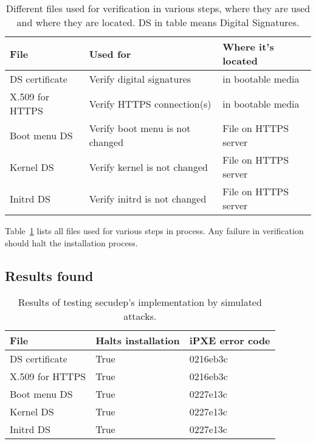 \begin{table}[!ht]
  \def\arraystretch{1.1}%
  \begin{center}
    \begin{tabular}{| l | l | l |}
      \hline
      File            & Used for                        & Where it's located   \\
      \hline
      DS certificate  & Verify digital signatures       & in bootable media    \\
      X.509 for HTTPS & Verify HTTPS connection(s)      & in bootable media    \\
      Boot menu DS    & Verify boot menu is not changed & File on HTTPS server \\
      Kernel DS       & Verify kernel is not changed    & File on HTTPS server \\
      Initrd DS       & Verify initrd is not changed    & File on HTTPS server \\
      \hline
    \end{tabular}
    \caption{Different files used for verification in various steps,
      where they are used and where they are located. DS in table
      means Digital Signatures.\label{tab:verification_files}}
  \end{center}
\end{table}

Table~\ref{tab:verification_files} lists all files used for various
steps in process. Any failure in verification should halt the installation process.


\subsection{Results found}

\begin{table}[!ht]
  \def\arraystretch{1.1}%
  \begin{center}
    \begin{tabular}{| l | l | l |}
      \hline
      File            & Halts installation & iPXE error code \\
      \hline
      DS certificate  & True               & 0216eb3c        \\
      X.509 for HTTPS & True               & 0216eb3c        \\
      Boot menu DS    & True               & 0227e13c        \\
      Kernel DS       & True               & 0227e13c        \\
      Initrd DS       & True               & 0227e13c        \\
      \hline
    \end{tabular}
    \caption{Results of testing secudep's implementation by simulated
      attacks.\label{tab:mechanical_check_results}}
  \end{center}
\end{table}

